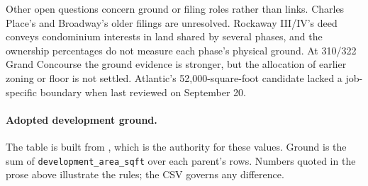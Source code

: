 Other open questions concern ground or filing roles rather than links. Charles
Place's and Broadway's older filings are unresolved. Rockaway III/IV's deed
conveys condominium interests in land shared by several phases, and the
ownership percentages do not measure each phase's physical ground. At 310/322
Grand Concourse the ground evidence is stronger, but the allocation of earlier
zoning or floor is not settled. Atlantic's 52,000-square-foot candidate lacked
a job-specific boundary when last reviewed on September 20.

\paragraph{Adopted development ground.}
The table is built from
, which
is the authority for these values. Ground is the sum of
\texttt{development\_area\_sqft} over each parent's rows. Numbers quoted in the
prose above illustrate the rules; the CSV governs any difference.

